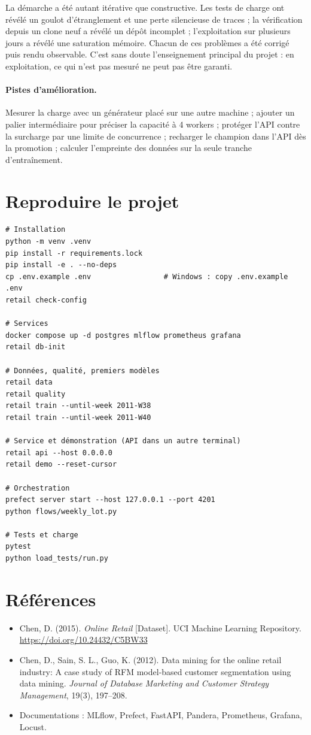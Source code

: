 \documentclass[11pt,a4paper]{article}
\begin{document}
La démarche a été autant itérative que constructive. Les tests de charge ont révélé un goulot
d'étranglement et une perte silencieuse de traces ; la vérification depuis un clone neuf a
révélé un dépôt incomplet ; l'exploitation sur plusieurs jours a révélé une saturation
mémoire. Chacun de ces problèmes a été corrigé puis rendu observable. C'est sans doute
l'enseignement principal du projet : en exploitation, ce qui n'est pas mesuré ne peut pas
être garanti.

\paragraph{Pistes d'amélioration.} Mesurer la charge avec un générateur placé sur une autre
machine ; ajouter un palier intermédiaire pour préciser la capacité à 4 workers ; protéger
l'API contre la surcharge par une limite de concurrence ; recharger le champion dans l'API
dès la promotion ; calculer l'empreinte des données sur la seule tranche d'entraînement.

\appendix
\section{Reproduire le projet}\label{ann:commandes}

\begin{lstlisting}
# Installation
python -m venv .venv
pip install -r requirements.lock
pip install -e . --no-deps
cp .env.example .env                 # Windows : copy .env.example .env
retail check-config

# Services
docker compose up -d postgres mlflow prometheus grafana
retail db-init

# Données, qualité, premiers modèles
retail data
retail quality
retail train --until-week 2011-W38
retail train --until-week 2011-W40

# Service et démonstration (API dans un autre terminal)
retail api --host 0.0.0.0
retail demo --reset-cursor

# Orchestration
prefect server start --host 127.0.0.1 --port 4201
python flows/weekly_lot.py

# Tests et charge
pytest
python load_tests/run.py
\end{lstlisting}

\section{Références}

\begin{itemize}
  \item Chen, D. (2015). \emph{Online Retail} [Dataset]. UCI Machine Learning Repository.
        \url{https://doi.org/10.24432/C5BW33}
  \item Chen, D., Sain, S. L., Guo, K. (2012). Data mining for the online retail industry:
        A case study of RFM model-based customer segmentation using data mining.
        \emph{Journal of Database Marketing and Customer Strategy Management}, 19(3), 197--208.
  \item Documentations : MLflow, Prefect, FastAPI, Pandera, Prometheus, Grafana, Locust.
\end{itemize}
\end{document}
